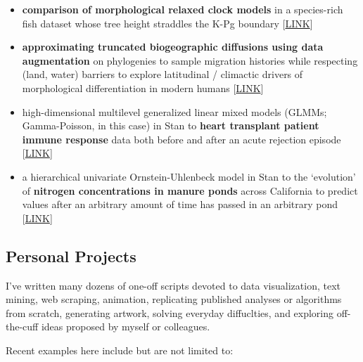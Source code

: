 \documentclass[12pt]{article}
\begin{document}
\begin{itemize}[noitemsep]

\item \textbf{comparison of morphological relaxed clock models} in a species-rich fish dataset whose tree height straddles the K-Pg boundary [\href{https://github.com/NikVetr/dissertation_work/blob/961baf0f64fe6139dc2c1723d37dcd4d51cbd16a/rateHeterogeneity\_DisparityThroughTime.R}{LINK}]
\item \textbf{approximating truncated biogeographic diffusions using data augmentation} on phylogenies to sample migration histories while respecting (land, water) barriers to explore latitudinal / climactic drivers of morphological differentiation in modern humans [\href{https://github.com/NikVetr/dissertation\_work/blob/961baf0f64fe6139dc2c1723d37dcd4d51cbd16a/truncatedBMapprox.R}{LINK}]
\item high-dimensional multilevel generalized linear mixed models (GLMMs; Gamma-Poisson, in this case) in Stan to \textbf{heart transplant patient immune response} data both before and after an acute rejection episode [\href{https://github.com/NikVetr/side\_projects/blob/master/multilevelPoisson.R}{LINK}]
\item a hierarchical univariate Ornstein-Uhlenbeck model in Stan to the `evolution' of \textbf{nitrogen concentrations in manure ponds} across California to predict values after an arbitrary amount of time has passed in an arbitrary pond [\href{https://github.com/NikVetr/side_projects/blob/24f7e38876a95433364123441f9b41d260105be6/OUmodel\_manurePonds.R}{LINK}]

\end{itemize}

%

\subsection{Personal Projects}
I've written many dozens of one-off scripts devoted to data visualization, text mining, web scraping, animation, replicating published analyses or algorithms from scratch, generating artwork, solving everyday diffuclties, and exploring off-the-cuff ideas proposed by myself or colleagues.

Recent examples here include but are not limited to:
\end{document}
